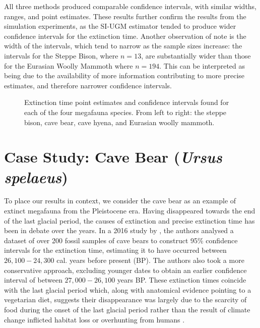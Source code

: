 All three methods produced comparable confidence intervals, with similar widths, ranges, and point estimates. These results further confirm the results from the simulation experiments, as the SI-UGM estimator tended to produce wider confidence intervals for the extinction time. Another observation of note is the width of the intervals, which tend to narrow as the sample sizes increase: the intervals for the Steppe Bison, where $n = 13$, are substantially wider than those for the Eurasian Woolly Mammoth where $n = 194$. This can be interpreted as being due to the availability of more information contributing to more precise estimates, and therefore narrower confidence intervals. 
\begin{figure}[ht]
    \centering
    
    \caption{Extinction time point estimates and confidence intervals found for each of the four megafauna species. From left to right: the steppe bison, cave bear, cave hyena, and Eurasian woolly mammoth.}
    \label{fig:applications-confidence-intervals}
\end{figure}

\section{Case Study: Cave Bear (\textit{Ursus spelaeus})}

To place our results in context, we consider the cave bear as an example of extinct megafauna from the Pleistocene era. Having disappeared towards the end of the last glacial period, the causes of extinction and precise extinction time has been in debate over the years. In a 2016 study by \citet{Baca2016}, the authors analysed a dataset of over 200 fossil samples of cave bears to construct 95\% confidence intervals for the extinction time, estimating it to have occurred between $26,100 - 24,300$ cal. years before present (BP). The authors also took a more conservative approach, excluding younger dates to obtain an earlier confidence interval of between $27,000 - 26,100$ years BP. These extinction times coincide with the last glacial period which, along with anatomical evidence pointing to a vegetarian diet, suggests their disappearance was largely due to the scarcity of food during the onset of the last glacial period rather than the result of climate change inflicted habitat loss or overhunting from humans \cite{Pacher2009}. 

